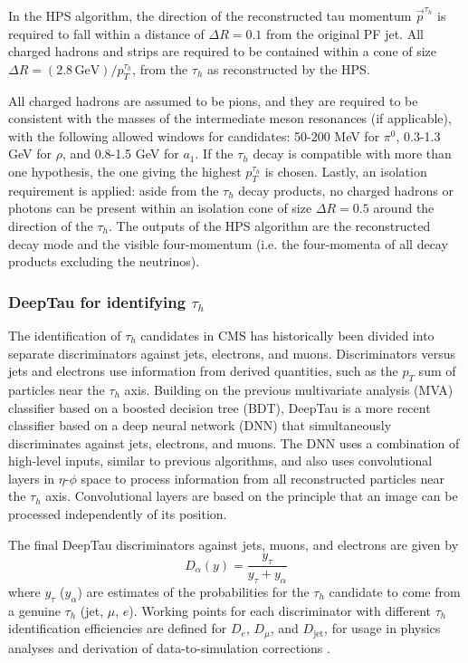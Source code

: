 In the HPS algorithm, the direction of the reconstructed tau momentum $\vec{p}^{\tau_{h}}$ is required to fall within a distance of $\Delta R = 0.1$ from the original PF jet. All charged hadrons and strips are required to be contained within a cone of size $\Delta R = (2.8 \,\text{GeV})/p_{T}^{\tau_{h}}$, from the $\tau_{h}$ as reconstructed by the HPS. 

All charged hadrons are assumed to be pions, and they are required to be consistent with the masses of the intermediate meson resonances (if applicable), with the following allowed windows for candidates: 50-200 MeV for $\pi^0$, 0.3-1.3 GeV for $\rho$, and 0.8-1.5 GeV for $a_1$. If the $\tau_{h}$ decay is compatible with more than one hypothesis, the one giving the highest $p_{T}^{\tau_{h}}$ is chosen. Lastly, an isolation requirement is applied: aside from the $\tau_{h}$ decay products, no charged hadrons or photons can be present within an isolation cone of size $\Delta R = 0.5$ around the direction of the $\tau_{h}$. The outputs of the HPS algorithm are the reconstructed decay mode and the visible four-momentum (i.e. the four-momenta of all decay products excluding the neutrinos).

\subsubsection{DeepTau for identifying \texorpdfstring{$\tau_{h}$}{tauh}}
The identification of $\tau_{h}$ candidates in CMS has historically been divided into separate discriminators against jets, electrons, and muons. Discriminators versus jets and electrons use information from derived quantities, such as the $p_{T}$ sum of particles near the $\tau_{h}$ axis. Building on the previous multivariate analysis (MVA) classifier \cite{CMS-TAU-16-003} based on a boosted decision tree (BDT), DeepTau is a more recent classifier based on a deep neural network (DNN) that simultaneously discriminates against jets, electrons, and muons. The DNN uses a combination of high-level inputs, similar to previous algorithms, and also uses convolutional layers in $\eta$-$\phi$ space to process information from all reconstructed particles near the $\tau_{h}$ axis. Convolutional layers are based on the principle that an image can be processed independently of its position. 

The final DeepTau discriminators against jets, muons, and electrons are given by 
\begin{equation}
    D_\alpha(y) = \frac{y_{\tau}}{y_{\tau} + y_{\alpha}}
\end{equation}
where $y_\tau$ ($y_\alpha$) are estimates of the probabilities for the $\tau_{h}$ candidate to come from a genuine $\tau_{h}$ (jet, $\mu$, $e$). Working points for each discriminator with different $\tau_{h}$ identification efficiencies are defined for $D_{e}$, $D_{\mu}$, and $D_{\text{jet}}$, for usage in physics analyses and derivation of data-to-simulation corrections \cite{2022-PRD-DeepTau}. 

